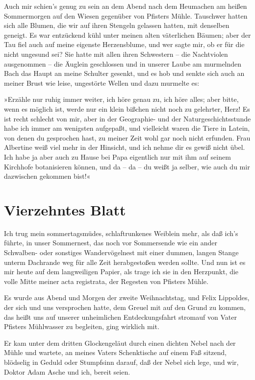 Auch mir schien's genug zu sein an dem Abend nach dem Heumachen am
heißen Sommermorgen auf den Wiesen gegenüber von Pfisters Mühle.
Tauschwer hatten sich alle Blumen, die wir auf ihren Stengeln
gelassen hatten, mit denselben geneigt. Es war entzückend kühl
unter meinen alten väterlichen Bäumen; aber der Tau fiel auch auf
meine eigenste Herzensblume, und wer sagte mir, ob er für die nicht
ungesund sei? Sie hatte mit allen ihren Schwestern – die
Nachtviolen ausgenommen – die Äuglein geschlossen und in unserer
Laube am murmelnden Bach das Haupt an meine Schulter gesenkt, und
es hob und senkte sich auch an meiner Brust wie leise, ungestörte
Wellen und dazu murmelte es:

»Erzähle nur ruhig immer weiter, ich höre genau zu, ich höre alles;
aber bitte, wenn es möglich ist, werde nur ein klein bißchen nicht
noch zu gelehrter, Herz! Es ist recht schlecht von mir, aber in der
Geographie- und der Naturgeschichtsstunde habe ich immer am
wenigsten aufgepaßt, und vielleicht waren die Tiere in Latein, von
denen du gesprochen hast, zu meiner Zeit wohl gar noch nicht
erfunden. Frau Albertine weiß viel mehr in der Hinsicht, und ich
nehme dir es gewiß nicht übel. Ich habe ja aber auch zu Hause bei
Papa eigentlich nur mit ihm auf seinem Kirchhofe botanisieren
können, und da – da – du weißt ja selber, wie auch du mir
dazwischen gekommen bist!«

\section{Vierzehntes Blatt}

Ich trug mein sommertagsmüdes, schlaftrunkenes Weiblein mehr, als
daß ich's führte, in unser Sommernest, das noch vor Sommersende wie
ein ander Schwalben- oder sonstiges Wandervögelnest mit einer
dummen, langen Stange unterm Dachrande weg für alle Zeit
herabgestoßen werden sollte. Und nun ist es mir heute auf dem
langweiligen Papier, als trage ich sie in den Herzpunkt, die volle
Mitte meiner acta registrata, der Regesten von Pfisters Mühle.

Es wurde aus Abend und Morgen der zweite Weihnachtstag, und Felix
Lippoldes, der sich und uns versprochen hatte, dem Greuel mit auf
den Grund zu kommen, das heißt uns auf unserer unheimlichen
Entdeckungsfahrt stromauf von Vater Pfisters Mühlwasser zu
begleiten, ging wirklich mit.

Er kam unter dem dritten Glockengeläut durch einen dichten Nebel
nach der Mühle und wartete, an meines Vaters Schenktische auf einem
Faß sitzend, blödselig in Geduld oder Stumpfsinn darauf, daß der
Nebel sich lege, und wir, Doktor Adam Asche und ich, bereit seien.

